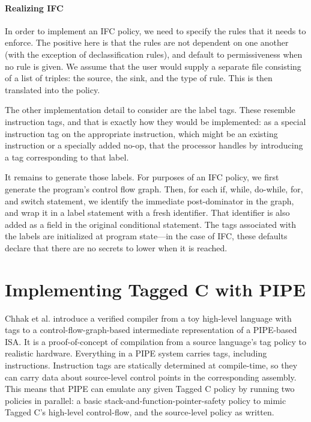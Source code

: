 \documentclass{llncs}
\begin{document}

\paragraph*{Realizing IFC}

In order to implement an IFC policy, we need to specify the rules that it needs to enforce.
The positive here is that the rules are not dependent on one another (with the exception of
declassification rules), and default to permissiveness when no rule is given. We assume that
the user would supply a separate file consisting of a list of triples: the source, the sink,
and the type of rule. This is then translated into the policy.

The other implementation detail to consider are the label tags. These resemble
instruction tags, and that is exactly how they would be implemented: as a special instruction
tag on the appropriate instruction, which might be an existing instruction or a specially
added no-op, that the processor handles by introducing a tag corresponding to that label.

It remains to generate those labels. For purposes of an IFC policy, we first generate the program's
control flow graph. Then, for each if, while, do-while, for, and switch statement, we identify the
immediate post-dominator in the graph, and wrap it in a label statement with a fresh identifier.
That identifier is also added as a field in the original conditional statement. The tags
associated with the labels are initialized at program state---in the case of IFC, these defaults
declare that there are no secrets to lower when it is reached.

\section{Implementing Tagged C with PIPE}
\label{sec:optionals}

Chhak et al. \cite{Chhak21:Tagine} introduce a verified compiler from a toy
high-level language with tags
to a control-flow-graph-based intermediate representation of a PIPE-based
ISA. It is a proof-of-concept of compilation from a source language's tag policy to
realistic hardware. Everything in a PIPE system carries tags, including instructions. 
Instruction tags are statically determined at compile-time, so they can carry data about source-level
control points in the corresponding assembly. This means that PIPE can emulate any given Tagged C
policy by running two policies in parallel: a basic stack-and-function-pointer-safety policy to mimic Tagged C's
high-level control-flow, and the source-level policy as written.
 
\end{document}
